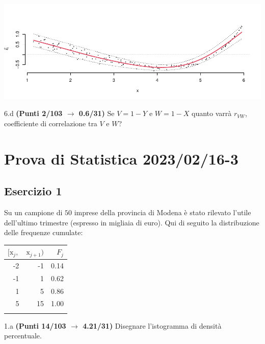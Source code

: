\documentclass[
  11pt,
]{book}
\theoremstyle{mytheoremstyle}
\theoremstyle{mydefstyle}
\newenvironment{sol}
  {
  \begin{tcolorbox}[enhanced,breakable,arc=0.1mm,boxrule=1pt,colback=white,colframe=iblue,
  title=\bf \fontfamily{lmss}\selectfont \hspace{.5 cm} Soluzione,drop fuzzy shadow]

}{
\end{tcolorbox}
  }
\begin{document}
\begin{sol}

\begin{center}\includegraphics{Esami_passati_con_soluzioni_files/figure-latex/2023-26,-1} \end{center}

\end{sol}

6.d \textbf{(Punti 2/103 \(\rightarrow\) 0.6/31)} Se \(V= 1 - Y\) e \(W= 1 - X\) quanto varrà \(r_{VW}\), coefficiente di correlazione tra \(V\) e \(W\)?

\section{Prova di Statistica 2023/02/16-3}\label{prova-di-statistica-20230216-3}

\subsection{Esercizio 1}\label{esercizio-1-25}

Su un campione di \(50\) imprese della provincia di Modena è stato rilevato l'utile dell'ultimo trimestre (espresso in migliaia di euro). Qui di seguito la distribuzione delle frequenze cumulate:

\begin{table}[H]
\centering
\begin{tabular}{rrr}
\toprule
$[\text{x}_j,$ & $\text{x}_{j+1})$ & $F_j$\\
\midrule
-2 & -1 & 0.14\\
-1 & 1 & 0.62\\
1 & 5 & 0.86\\
5 & 15 & 1.00\\
 &  & \\
\bottomrule
\end{tabular}
\end{table}

1.a \textbf{(Punti 14/103 \(\rightarrow\) 4.21/31)} Disegnare l'istogramma di densità percentuale.
\end{document}
